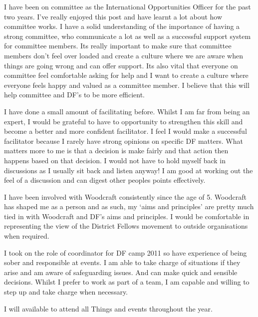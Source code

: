 \documentclass[a4paper, 11pt]{article} %
\begin{document}
\begin{onehalfspacing}
I have been on committee as the International Opportunities Officer for the past two years. I've really enjoyed this post and have learnt a lot about how committee works. I have a solid understanding of the importance of having a strong committee, who communicate a lot as well as a successful support system for committee members. Its really important to make sure that committee members don't feel over loaded and create a culture where we are aware when things are going wrong and can offer support. Its also vital that everyone on committee feel comfortable asking for help and I want to create a culture where everyone feels happy and valued as a committee member. I believe that this will help committee and DF's to be more efficient.

I have done a small amount of facilitating before. Whilst I am far from being an expert, I would be grateful to have to opportunity to strengthen this skill and become a better and more confident facilitator. I feel I would make a successful facilitator because I rarely have strong opinions on specific DF matters. What matters more to me is that a decision is make fairly and that action then happens based on that decision. I would not have to hold myself back in discussions as I usually sit back and listen anyway! I am good at working out the feel of a discussion and can digest other peoples points effectively.

I have been involved with Woodcraft consistently since the age of 5. Woodcraft has shaped me as a person and as such, my `aims and principles' are pretty much tied in with Woodcraft and DF's aims and principles. I would be comfortable in representing the view of the District Fellows movement to outside organisations when required.

I took on the role of coordinator for DF camp 2011 so have experience of being sober and responsible at events. I am able to take charge of situations if they arise and am aware of safeguarding issues. And can make quick and sensible decisions. Whilst I prefer to work as part of a team, I am capable and willing to step up and take charge when necessary.

I will available to attend all Things and events throughout the year.


\end{onehalfspacing}
\end{document}
